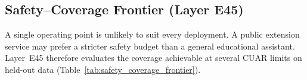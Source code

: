 \documentclass[a4paper,fleqn]{cas-dc}
\begin{document}
\begin{table}[pos=t]
\centering
\caption{Risk--coverage calibration on held-out test split (Layer E04, 20{,}112 cases; 12{,}068 train / 4{,}022 dev / 4{,}022 test).}
\label{tab:risk_coverage_calibration}
\label{tab:risk_coverage}
\small
{}
\end{table}


\subsection{Safety--Coverage Frontier (Layer E45)}

A single operating point is unlikely to suit every deployment. A public extension service may prefer a stricter safety budget than a general educational assistant. Layer~E45 therefore evaluates the coverage achievable at several CUAR limits on held-out data (Table~\ref{tab:safety_coverage_frontier}).
\end{document}
